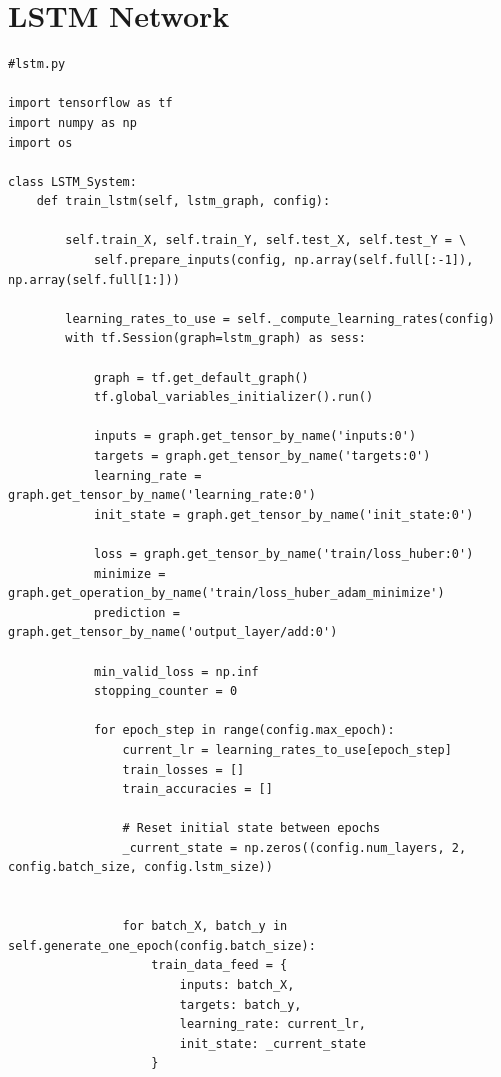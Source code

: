 \documentclass[12pt,a4paper,twoside,openright]{report}
\begin{document}
\pagebreak
\section{LSTM Network}
\label{appendix:LSTM}

\begin{lstlisting}[caption={A snippet of simplified \texttt{Python} code for the LSTM Network's main function},captionpos=b,label={lst:NB}]
#lstm.py

import tensorflow as tf
import numpy as np
import os

class LSTM_System:
    def train_lstm(self, lstm_graph, config):

        self.train_X, self.train_Y, self.test_X, self.test_Y = \
            self.prepare_inputs(config, np.array(self.full[:-1]), np.array(self.full[1:]))

        learning_rates_to_use = self._compute_learning_rates(config)
        with tf.Session(graph=lstm_graph) as sess:

            graph = tf.get_default_graph()
            tf.global_variables_initializer().run()

            inputs = graph.get_tensor_by_name('inputs:0')
            targets = graph.get_tensor_by_name('targets:0')
            learning_rate = graph.get_tensor_by_name('learning_rate:0')
            init_state = graph.get_tensor_by_name('init_state:0')

            loss = graph.get_tensor_by_name('train/loss_huber:0')
            minimize = graph.get_operation_by_name('train/loss_huber_adam_minimize')
            prediction = graph.get_tensor_by_name('output_layer/add:0')

            min_valid_loss = np.inf
            stopping_counter = 0

            for epoch_step in range(config.max_epoch):
                current_lr = learning_rates_to_use[epoch_step]
                train_losses = []
                train_accuracies = []

                # Reset initial state between epochs
                _current_state = np.zeros((config.num_layers, 2, config.batch_size, config.lstm_size))


                for batch_X, batch_y in self.generate_one_epoch(config.batch_size):
                    train_data_feed = {
                        inputs: batch_X,
                        targets: batch_y,
                        learning_rate: current_lr,
                        init_state: _current_state
                    }


\end{lstlisting}
\end{document}
